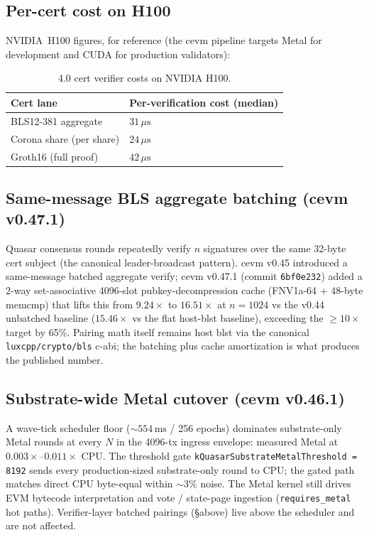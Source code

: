 \subsection{Per-cert cost on H100}

NVIDIA~H100 figures, for reference (the cevm pipeline targets Metal
for development and CUDA for production validators):

\begin{table}[ht]
\centering
\small
\caption{4.0 cert verifier costs on NVIDIA H100.}
\label{tab:perf-h100}
\begin{tabular}{ll}
\toprule
\textbf{Cert lane} & \textbf{Per-verification cost (median)} \\
\midrule
BLS12-381 aggregate & $31\,\mu\text{s}$ \\
Corona share (per share)     & $24\,\mu\text{s}$ \\
Groth16 (full proof)& $42\,\mu\text{s}$ \\
\bottomrule
\end{tabular}
\end{table}

\subsection{Same-message BLS aggregate batching (cevm v0.47.1)}

Quasar consensus rounds repeatedly verify $n$ signatures over the
same 32-byte cert subject (the canonical leader-broadcast pattern).
cevm v0.45 introduced a same-message batched aggregate verify;
cevm v0.47.1 (commit \texttt{6bf0e232}) added a 2-way set-associative
4096-slot pubkey-decompression cache (FNV1a-64 + 48-byte memcmp)
that lifts this from $9.24\times$ to
$\mathbf{16.51\times}$ at $n{=}1024$ vs the v0.44 unbatched baseline
($\mathbf{15.46\times}$ vs the flat host-blst baseline),
exceeding the $\geq 10\times$ target by 65\%. Pairing math itself
remains host blst via the canonical \texttt{luxcpp/crypto/bls} c-abi;
the batching plus cache amortization is what produces the published
number.

\subsection{Substrate-wide Metal cutover (cevm v0.46.1)}

A wave-tick scheduler floor (${\sim}554\,\text{ms}$ / 256 epochs)
dominates substrate-only Metal rounds at every $N$ in the 4096-tx
ingress envelope: measured Metal at $0.003\times$--$0.011\times$ CPU.
The threshold gate \texttt{kQuasarSubstrateMetalThreshold = 8192}
sends every production-sized substrate-only round to CPU; the gated
path matches direct CPU byte-equal within ${\sim}3\%$ noise. The
Metal kernel still drives EVM bytecode interpretation and
vote / state-page ingestion (\texttt{requires\_metal} hot paths).
Verifier-layer batched pairings (\S above) live above the scheduler
and are not affected.

